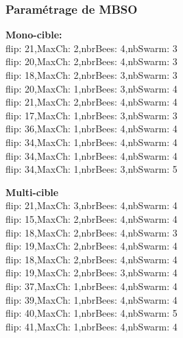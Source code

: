 \subsubsection{Paramétrage de MBSO}
\noindent
\begin{minipage}[t]{0.55\textwidth}
	\textbf{Mono-cible:} \\
flip: 21,MaxCh: 2,nbrBees: 4,nbSwarm: 3\\
flip: 20,MaxCh: 2,nbrBees: 4,nbSwarm: 3\\
flip: 18,MaxCh: 2,nbrBees: 3,nbSwarm: 3\\
flip: 20,MaxCh: 1,nbrBees: 3,nbSwarm: 4\\
flip: 21,MaxCh: 2,nbrBees: 4,nbSwarm: 4\\
flip: 17,MaxCh: 1,nbrBees: 3,nbSwarm: 3\\
flip: 36,MaxCh: 1,nbrBees: 4,nbSwarm: 4\\
flip: 34,MaxCh: 1,nbrBees: 4,nbSwarm: 4\\
flip: 34,MaxCh: 1,nbrBees: 4,nbSwarm: 4\\
flip: 34,MaxCh: 1,nbrBees: 3,nbSwarm: 5

\end{minipage}\hfill
\hspace{0.2cm}
\begin{minipage}[t]{0.55\textwidth}
	\textbf{Multi-cible}\\
flip: 21,MaxCh: 3,nbrBees: 4,nbSwarm: 4\\
flip: 15,MaxCh: 2,nbrBees: 4,nbSwarm: 4\\
flip: 18,MaxCh: 2,nbrBees: 4,nbSwarm: 3\\
flip: 19,MaxCh: 2,nbrBees: 4,nbSwarm: 4\\
flip: 18,MaxCh: 2,nbrBees: 4,nbSwarm: 4\\
flip: 19,MaxCh: 2,nbrBees: 3,nbSwarm: 4\\
flip: 37,MaxCh: 1,nbrBees: 4,nbSwarm: 4\\
flip: 39,MaxCh: 1,nbrBees: 4,nbSwarm: 4\\
flip: 40,MaxCh: 1,nbrBees: 4,nbSwarm: 5\\
flip: 41,MaxCh: 1,nbrBees: 4,nbSwarm: 4
\end{minipage}\hfill




